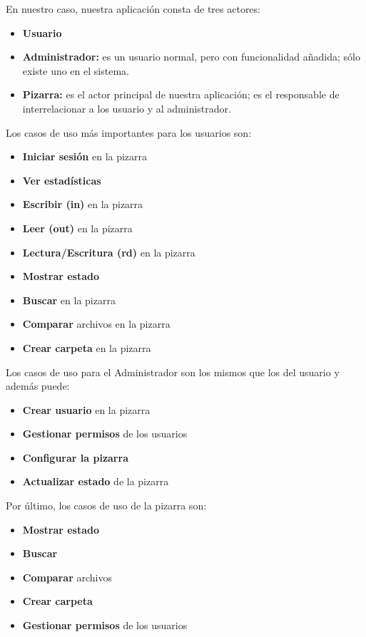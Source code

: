En nuestro caso, nuestra aplicación consta de tres actores:
\begin{itemize}
\item \textbf{Usuario}
\item \textbf{Administrador:} es un usuario normal, pero con funcionalidad añadida; sólo existe uno en el sistema.
\item \textbf{Pizarra:} es el actor principal de nuestra aplicación; es el responsable de interrelacionar a los usuario y al administrador.   
\end{itemize}

Los casos de uso más importantes para los usuarios son:
\begin{itemize}
\item \textbf{Iniciar sesión} en la pizarra
\item \textbf{Ver estadísticas} 
\item \textbf{Escribir (in)} en la pizarra
\item \textbf{Leer (out)} en la pizarra
\item \textbf{Lectura/Escritura (rd)} en la pizarra
\item \textbf{Mostrar estado}
\item \textbf{Buscar} en la pizarra
\item \textbf{Comparar} archivos en la pizarra
\item \textbf{Crear carpeta} en la pizarra
\end{itemize}

Los casos de uso para el Administrador son los mismos que los del usuario y además puede:
\begin{itemize}
\item \textbf{Crear usuario} en la pizarra
\item \textbf{Gestionar permisos} de los usuarios
\item \textbf{Configurar la pizarra}
\item \textbf{Actualizar estado} de la pizarra
\end{itemize}

Por último, los casos de uso de la pizarra son:
\begin{itemize}
\item \textbf{Mostrar estado}
\item \textbf{Buscar}
\item \textbf{Comparar} archivos
\item \textbf{Crear carpeta}
\item \textbf{Gestionar permisos} de los usuarios
\end{itemize} 

